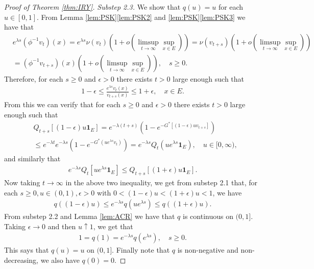 \documentclass[12pt,a4paper]{amsart}
\numberwithin{equation}{section}
\theoremstyle{plain}
\theoremstyle{definition}
\begin{document}
\begin{proof}[Proof of Theorem \ref{thm:IRY}]
\emph{Substep 2.3.}
We show that $q(u) = u$ for each $u \in [0,1]$.
From Lemma \ref{lem:PSK}\eqref{lem:PSK2} and \ref{lem:PSK}\eqref{lem:PSK3} we have that
\begin{align}
	& e^{\lambda s}(\phi^{-1}v_t)(x) 
  = e^{\lambda s}\nu(v_{t})(1+o(\limsup_{t\to \infty}\sup_{x\in E})) 
   =\nu(v_{t+s}) (1+o(\limsup_{t\to \infty}\sup_{x\in E})) \\
  & = (\phi^{-1}v_{t+s})(x) (1+o(\limsup_{t\to \infty} \sup_{x\in E}))
    , \quad s\geq 0.
\end{align}
Therefore, for each $s\geq 0$ and $\epsilon >0$ there exists $t>0$ large enough such that
\begin{align}
	1-\epsilon\leq \frac{e^{\lambda s}v_t(x)}{v_{t+s}(x)} 
  \leq 1+\epsilon,
  \quad x\in E.
\end{align}
From this we can verify that for each $s\geq 0$ and $\epsilon >0$ there exists $t>0$ large enough such that
\begin{align}
	& Q_{t+s}[ (1-\epsilon)u\mathbf 1_E ]
   = e^{-\lambda(t+s)}( 1-e^{-G^*[(1-\epsilon)uv_{t+s}]} ) \\
  & \leq e^{-\lambda t} e^{-\lambda s}( 1- e^{-G^*(ue^{\lambda s}v_t)} )
    = e^{-\lambda s}Q_t(ue^{\lambda s} \mathbf 1_E),
    \quad u \in [0,\infty),
\end{align}
and similarly that
\begin{align}
	e^{-\lambda s}Q_t[ue^{\lambda s}\mathbf 1_E] 
  \leq Q_{t+s}[(1+\epsilon)u\mathbf 1_E].
\end{align}
Now taking $t\to \infty$ in the above two inequality, we get from substep 2.1 that, for each $s\geq 0, u\in (0,1), \epsilon > 0$ with $0 < (1 - \epsilon) u < (1+\epsilon)u < 1$, we have
 \begin{align}
   q((1-\epsilon)u)\leq e^{-\lambda s}q(u e^{\lambda s}) \leq q((1+\epsilon)u).
 \end{align}
 From substep 2.2 and Lemma \ref{lem:ACR} we have that $q$ is continuous on $(0,1]$. 
Taking $\epsilon \to 0$ and then $u \uparrow 1$, we get that 
\begin{align}
	1
  =q(1) 
  = e^{- \lambda s} q(e^{\lambda s}), 
  \quad s \geq 0. 
\end{align} 
This says that $q(u) = u$ on $(0,1]$.
Finally note that $q$ is non-negative and non-decreasing, we also have $q(0) = 0$.


\end{proof}
\end{document}

